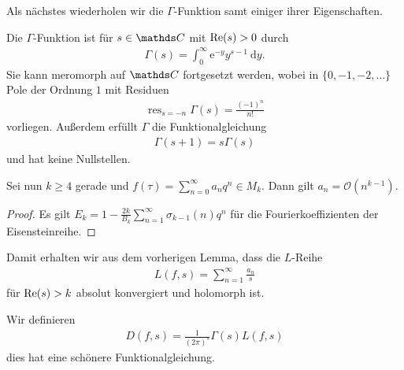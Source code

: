 Als nächstes wiederholen wir die $\Gamma$-Funktion samt einiger ihrer Eigenschaften.

Die $\Gamma$-Funktion ist für $s \in \C$ mit $\operatorname{Re}(s)>0$ durch
\begin{align*}
\Gamma(s)=\int_0^\infty \mathrm{e}^{-y} y^{s-1}~\mathrm{d}y.
\end{align*}
Sie kann meromorph auf $\C$ fortgesetzt werden, wobei in $\{0,-1,-2,\dots\}$ Pole der Ordnung $1$ mit Residuen
\begin{align*}
\operatorname{res}_{s=-n} \Gamma(s)=\frac{(-1)^n}{n!}
\end{align*}
vorliegen.
Außerdem erfüllt $\Gamma$ die Funktionalgleichung
\begin{align*}
\Gamma(s+1)=s\Gamma(s)
\end{align*}
und hat keine Nullstellen.

\begin{lem}
Sei nun $k\geq 4$ gerade und $f(\tau)=\sum_{n=0}^\infty a_nq^n\in M_k$.
Dann gilt $a_n=\mathcal{O}(n^{k-1})$.
\end{lem}
\begin{proof}
Es gilt $E_k=1-\frac{2k}{B_k}\sum_{n=1}^\infty \sigma_{k-1}(n)q^n$ für die Fourierkoeffizienten der Eisensteinreihe.
\end{proof}
Damit erhalten wir aus dem vorherigen Lemma, dass die $L$-Reihe
\begin{align*}
L(f,s)=\sum_{n=1}^\infty \frac{a_n}{s}
\end{align*}
für $\operatorname{Re}(s)>k$ absolut konvergiert und holomorph ist.

Wir definieren
\begin{align*}
D(f,s)=\frac{1}{(2\pi)^s} \Gamma(s)L(f,s)
\end{align*}
dies hat eine schönere Funktionalgleichung.

